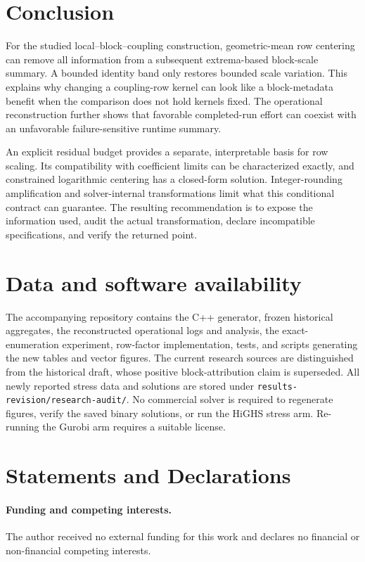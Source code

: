 \documentclass[11pt]{article}
\theoremstyle{definition}
\theoremstyle{remark}
\begin{document}
\section{Conclusion}
For the studied local--block--coupling construction, geometric-mean row centering
can remove all information from a subsequent extrema-based block-scale summary.
A bounded identity band only restores bounded scale variation. This explains why
changing a coupling-row kernel can look like a block-metadata benefit when the
comparison does not hold kernels fixed. The operational reconstruction further shows
that favorable completed-run effort can coexist with an unfavorable failure-sensitive
runtime summary.

An explicit residual budget provides a separate, interpretable basis for row scaling.
Its compatibility with coefficient limits can be characterized exactly, and constrained
logarithmic centering has a closed-form solution. Integer-rounding amplification and
solver-internal transformations limit what this conditional contract can guarantee.
The resulting recommendation is to expose the information used, audit the actual
transformation, declare incompatible specifications, and verify the returned point.

\section*{Data and software availability}
The accompanying repository contains the C++ generator, frozen historical aggregates,
the reconstructed operational logs and analysis, the exact-enumeration experiment,
row-factor implementation, tests, and scripts generating the new tables and vector
figures. The current research sources are distinguished from the historical draft,
whose positive block-attribution claim is superseded. All newly reported stress data
and solutions are stored under \texttt{results-revision/research-audit/}. No commercial
solver is required to regenerate figures, verify the saved binary solutions, or run the
HiGHS stress arm. Re-running the Gurobi arm requires a suitable license.

\section*{Statements and Declarations}
\paragraph{Funding and competing interests.}
The author received no external funding for this work and declares no financial or
non-financial competing interests.
\end{document}
